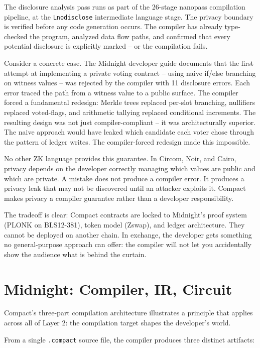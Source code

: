 \documentclass[
  11pt,
  openany]{report}
\begin{document}
The disclosure analysis pass runs as part of the 26-stage nanopass compilation
pipeline, at the \texttt{Lnodisclose} intermediate language stage. The privacy
boundary is verified before any code generation occurs. The compiler has already
type-checked the program, analyzed data flow paths, and confirmed that every
potential disclosure is explicitly marked -- or the compilation fails.

Consider a concrete case. The Midnight developer guide documents that the first
attempt at implementing a private voting contract -- using naive if/else
branching on witness values -- was rejected by the compiler with 11 disclosure
errors. Each error traced the path from a witness value to a public surface. The
compiler forced a fundamental redesign: Merkle trees replaced per-slot
branching, nullifiers replaced voted-flags, and arithmetic tallying replaced
conditional increments. The resulting design was not just compiler-compliant --
it was architecturally superior. The naive approach would have leaked which
candidate each voter chose through the pattern of ledger writes. The
compiler-forced redesign made this impossible.

No other ZK language provides this guarantee. In Circom, Noir, and Cairo,
privacy depends on the developer correctly managing which values are public and
which are private. A mistake does not produce a compiler error. It produces a
privacy leak that may not be discovered until an attacker exploits it. Compact
makes privacy a compiler guarantee rather than a developer responsibility.

The tradeoff is clear: Compact contracts are locked to Midnight's proof system
(PLONK on BLS12-381), token model (Zswap), and ledger architecture. They cannot
be deployed on another chain. In exchange, the developer gets something no
general-purpose approach can offer: the compiler will not let you accidentally
show the audience what is behind the curtain.

\section{Midnight: Compiler, IR, Circuit}\label{midnight-compiler-ir-circuit}

Compact's three-part compilation architecture illustrates a principle that
applies across all of Layer 2: the compilation target shapes the developer's
world.

From a single \texttt{.compact} source file, the compiler produces three
distinct artifacts:
\end{document}
